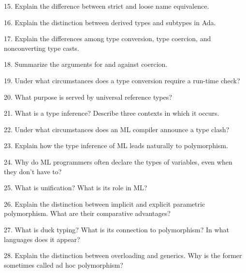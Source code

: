 \filbreak
\vskip 1cm

15. Explain the difference between strict and loose name equivalence.

\filbreak
\vskip 1cm

16. Explain the distinction between derived types and subtypes in Ada.

\filbreak
\vskip 1cm

17. Explain the differences among type conversion, type coercion, and nonconverting type casts.

\filbreak
\vskip 1cm

18. Summarize the arguments for and against coercion.

\filbreak
\vskip 1cm

19. Under what circumstances does a type conversion require a run-time check?

\filbreak
\vskip 1cm

20. What purpose is served by universal reference types?

\filbreak
\vskip 1cm

21. What is a type inference? Describe three contexts in which it occurs.

\filbreak
\vskip 1cm

22. Under what circumstances does an ML compiler announce a type clash?

\filbreak
\vskip 1cm

23. Explain how the type inference of ML leads naturally to polymorphism.

\filbreak
\vskip 1cm

24. Why do ML programmers often declare the types of variables, even when they don't have to?

\filbreak
\vskip 1cm

25. What is unification? What is its role in ML?

\filbreak
\vskip 1cm

26. Explain the distinction between implicit and explicit parametric polymorphism. What are their comparative advantages?

\filbreak
\vskip 1cm

27.  What is duck typing? What is its connection to polymorphism? In what languages does it appear?

\filbreak
\vskip 1cm

28. Explain the distinction between overloading and generics. Why is the former sometimes called ad hoc polymorphism?

\filbreak
\vskip 1cm

